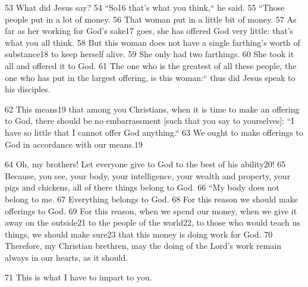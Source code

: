 53 What did Jesus say? 54 ``So16 that's what you think,`` he said.
55 ``Those people put in a lot of money. 56 That woman put in a little
bit of money. 57 As far as her working for God's sake17 goes, she has offered God
very little: that's what you all think. 58 But this woman does not have a single
farthing's worth of substance18 to keep herself alive. 59 She only had two farthings.
60 She took it all and offered it to God. 61 The one who is the greatest of all
these people, the one who has put in the largest offering, is this woman:``
thus did Jesus speak to his disciples.

62 This means19 that among you Christians, when it is time to make an offering
to God, there should be no embarrassment [such that you say to yourselves]: ``I
have so little that I cannot offer God anything.`` 63 We ought to make
offerings to God in accordance with our means.19

64 Oh, my brothers! Let everyone give to God to the best of his ability20! 65 Because,
you see, your body, your intelligence, your wealth and property, your pigs and
chickens, all of there things belong to God. 66 ``My body does not belong
to me. 67 Everything belongs to God. 68 For this reason we should make offerings
to God. 69 For this reason, when we spend our money, when we give it away on the
outside21 to the people of the world22, to those who would teach us things, we
should make sure23 that this money is doing work for God. 70 Therefore, my Christian
brethren, may the doing of the Lord's work remain always in our hearts, as it should.

71 This is what I have to impart to you.


